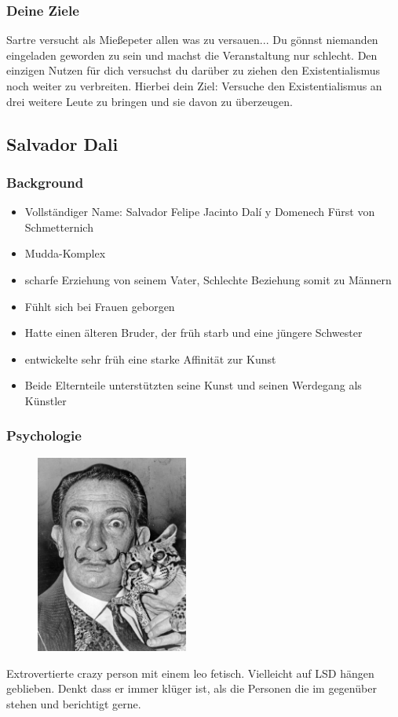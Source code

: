 \documentclass[12pt, a4paper, openany]{report}
\begin{document}
\subsubsection{Deine Ziele}
Sartre versucht als Mießepeter allen was zu versauen... Du gönnst niemanden eingeladen geworden zu sein und machst die Veranstaltung nur schlecht. Den einzigen Nutzen für dich versuchst du darüber zu ziehen den Existentialismus noch weiter zu verbreiten. Hierbei dein Ziel: Versuche den Existentialismus an drei weitere Leute zu bringen und sie davon zu überzeugen. 



\subsection{Salvador Dali}
\subsubsection{Background}
\begin{itemize}
\item Vollständiger Name: Salvador Felipe Jacinto Dalí y Domenech Fürst von Schmetternich
\item Mudda-Komplex
\item scharfe Erziehung von seinem Vater, Schlechte Beziehung somit zu Männern
\item Fühlt sich bei Frauen geborgen 
\item Hatte einen älteren Bruder, der früh starb und eine jüngere Schwester
\item entwickelte sehr früh eine starke Affinität zur Kunst
\item Beide Elternteile unterstützten seine Kunst und seinen Werdegang als Künstler
\end{itemize}

\subsubsection{Psychologie}

\begin{figure}[h!]
\centering
\includegraphics[width=5cm]{Salvador-Dali.jpg}
\end{figure}
Extrovertierte crazy person mit einem leo fetisch.  Vielleicht auf LSD hängen geblieben. Denkt dass er immer klüger ist, als die Personen die im gegenüber stehen und berichtigt gerne.
\end{document}
